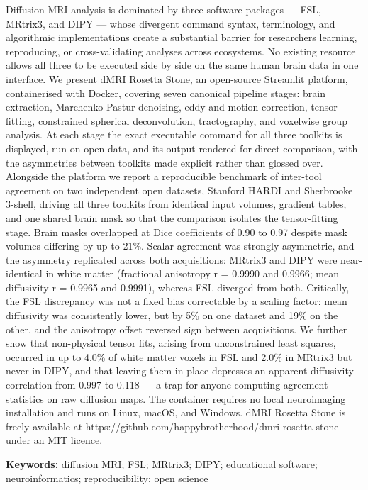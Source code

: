 \documentclass[12pt,a4paper]{article}
\begin{document}
Diffusion MRI analysis is dominated by three software packages --- FSL, MRtrix3, and DIPY --- whose divergent command syntax, terminology, and algorithmic implementations create a substantial barrier for researchers learning, reproducing, or cross-validating analyses across ecosystems. No existing resource allows all three to be executed side by side on the same human brain data in one interface. We present dMRI Rosetta Stone, an open-source Streamlit platform, containerised with Docker, covering seven canonical pipeline stages: brain extraction, Marchenko-Pastur denoising, eddy and motion correction, tensor fitting, constrained spherical deconvolution, tractography, and voxelwise group analysis. At each stage the exact executable command for all three toolkits is displayed, run on open data, and its output rendered for direct comparison, with the asymmetries between toolkits made explicit rather than glossed over. Alongside the platform we report a reproducible benchmark of inter-tool agreement on two independent open datasets, Stanford HARDI and Sherbrooke 3-shell, driving all three toolkits from identical input volumes, gradient tables, and one shared brain mask so that the comparison isolates the tensor-fitting stage. Brain masks overlapped at Dice coefficients of 0.90 to 0.97 despite mask volumes differing by up to 21\%. Scalar agreement was strongly asymmetric, and the asymmetry replicated across both acquisitions: MRtrix3 and DIPY were near-identical in white matter (fractional anisotropy r = 0.9990 and 0.9966; mean diffusivity r = 0.9965 and 0.9991), whereas FSL diverged from both. Critically, the FSL discrepancy was not a fixed bias correctable by a scaling factor: mean diffusivity was consistently lower, but by 5\% on one dataset and 19\% on the other, and the anisotropy offset reversed sign between acquisitions. We further show that non-physical tensor fits, arising from unconstrained least squares, occurred in up to 4.0\% of white matter voxels in FSL and 2.0\% in MRtrix3 but never in DIPY, and that leaving them in place depresses an apparent diffusivity correlation from 0.997 to 0.118 --- a trap for anyone computing agreement statistics on raw diffusion maps. The container requires no local neuroimaging installation and runs on Linux, macOS, and Windows. dMRI Rosetta Stone is freely available at https://github.com/happybrotherhood/dmri-rosetta-stone under an MIT licence.

\textbf{Keywords:} diffusion MRI; FSL; MRtrix3; DIPY; educational software; neuroinformatics; reproducibility; open science
\end{document}
